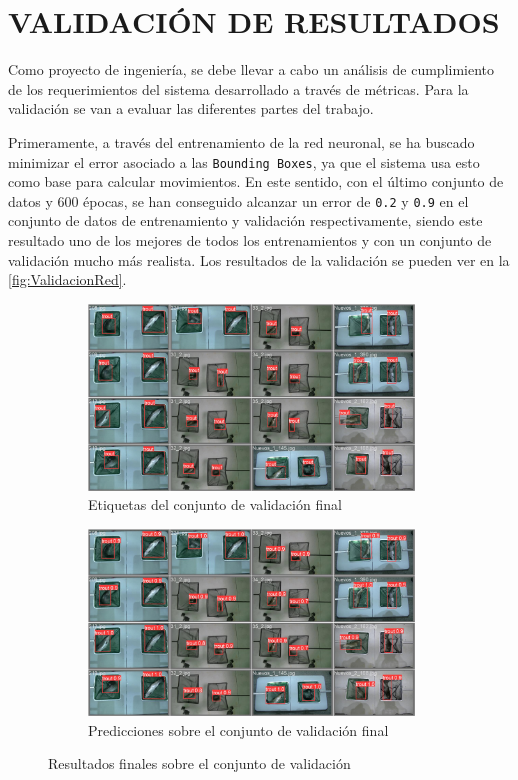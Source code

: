 \section{VALIDACIÓN DE RESULTADOS}

Como proyecto de ingeniería, se debe llevar a cabo un análisis de cumplimiento de los requerimientos del sistema desarrollado a través de métricas. Para la validación se van a evaluar las 
diferentes partes del trabajo.

Primeramente, a través del entrenamiento de la red neuronal, se ha buscado minimizar el error asociado a las \texttt{Bounding Boxes}, ya que el sistema usa esto como base para calcular movimientos. 
En este sentido, con el último conjunto de datos y 600 épocas, se han conseguido alcanzar un error de \texttt{0.2} y \texttt{0.9} en el conjunto de datos de entrenamiento y validación respectivamente, siendo 
este resultado uno de los mejores de todos los entrenamientos y con un conjunto de validación mucho más realista. Los resultados de la validación se pueden ver en la \autoref{fig:ValidacionRed}.

\begin{figure}[H]
    \centering
    \begin{subfigure}[b]{0.7\textwidth}
        \centering
        \includegraphics[width=0.95\textwidth]{images/7/labels.jpg}
        \caption{Etiquetas del conjunto de validación final}
    \end{subfigure}
    \begin{subfigure}[b]{0.7\textwidth}
        \centering
        \includegraphics[width=0.95\textwidth]{images/7/pred.jpg}
        \caption{Predicciones sobre el conjunto de validación final}
    \end{subfigure}
    \caption{Resultados finales sobre el conjunto de validación}
    \label{fig:ValidacionRed}
\end{figure}

